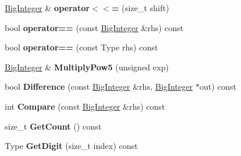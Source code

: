 \begin{DoxyCompactItemize}
\item 
\hyperlink{classinternal_1_1_big_integer}{Big\+Integer} \& {\bfseries operator$<$$<$=} (size\+\_\+t shift)\hypertarget{classinternal_1_1_big_integer_a48b12ef4676f19290dfd5816a4ef4a88}{}\label{classinternal_1_1_big_integer_a48b12ef4676f19290dfd5816a4ef4a88}

\item 
bool {\bfseries operator==} (const \hyperlink{classinternal_1_1_big_integer}{Big\+Integer} \&rhs) const \hypertarget{classinternal_1_1_big_integer_a567ecda3009de20400a2af649fb87e60}{}\label{classinternal_1_1_big_integer_a567ecda3009de20400a2af649fb87e60}

\item 
bool {\bfseries operator==} (const Type rhs) const \hypertarget{classinternal_1_1_big_integer_a329eddac1b724f82d56af2ee2c8abcc4}{}\label{classinternal_1_1_big_integer_a329eddac1b724f82d56af2ee2c8abcc4}

\item 
\hyperlink{classinternal_1_1_big_integer}{Big\+Integer} \& {\bfseries Multiply\+Pow5} (unsigned exp)\hypertarget{classinternal_1_1_big_integer_a98a13f169c27d1acfa57054f37c61763}{}\label{classinternal_1_1_big_integer_a98a13f169c27d1acfa57054f37c61763}

\item 
bool {\bfseries Difference} (const \hyperlink{classinternal_1_1_big_integer}{Big\+Integer} \&rhs, \hyperlink{classinternal_1_1_big_integer}{Big\+Integer} $\ast$out) const \hypertarget{classinternal_1_1_big_integer_a5741304ce36392adeef716e78b384b61}{}\label{classinternal_1_1_big_integer_a5741304ce36392adeef716e78b384b61}

\item 
int {\bfseries Compare} (const \hyperlink{classinternal_1_1_big_integer}{Big\+Integer} \&rhs) const \hypertarget{classinternal_1_1_big_integer_afd8b15480df5003ee6b6e1b8ecbf5f45}{}\label{classinternal_1_1_big_integer_afd8b15480df5003ee6b6e1b8ecbf5f45}

\item 
size\+\_\+t {\bfseries Get\+Count} () const \hypertarget{classinternal_1_1_big_integer_a720114cef0871c9f9c3c6a5f3a66e66a}{}\label{classinternal_1_1_big_integer_a720114cef0871c9f9c3c6a5f3a66e66a}

\item 
Type {\bfseries Get\+Digit} (size\+\_\+t index) const \hypertarget{classinternal_1_1_big_integer_a92c6854f2388875374cfb9801bea0cc8}{}\label{classinternal_1_1_big_integer_a92c6854f2388875374cfb9801bea0cc8}


\end{DoxyCompactItemize}
